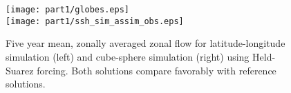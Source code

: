 \begin{figure}
 \begin{center}
   \texttt{[image: part1/globes.eps]}
\\
   \texttt{[image: part1/ssh\_sim\_assim\_obs.eps]}
 \end{center}
\caption{Five year mean, zonally averaged zonal flow for latitude-longitude
simulation (left) and cube-sphere simulation (right) using Held-Suarez
forcing. Both solutions compare favorably with reference solutions.}
\label{fig:hs_zave_u}
\end{figure}
